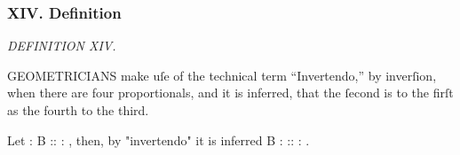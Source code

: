 \documentclass[12pt,preview]{standalone}
\begin{document}
\subsubsection{XIV. Definition}

\begin{minipage}{\textwidth}

    \begin{center}
        \textit{DEFINITION XIV.}\label{book5def14} \\
    \end{center}

    \hfill

    \raggedright G\textsc{EOMETRICIANS} make uſe of the technical term “Invertendo,” by inverſion, when there are four proportionals, and it is inferred, that the ſecond is to the firſt as the fourth to the third.

    \hfill

    \hfill

    Let {\color{cred}{A}} : B :: {\color{cblue}{C}} : {\color{cyellow}{D}}, then, by "invertendo" it is inferred B : {\color{cred}{A}} :: {\color{cyellow}{D}} : {\color{cblue}{C}}.


\end{minipage}
\end{document}
